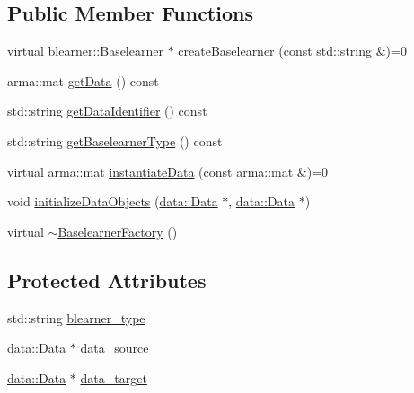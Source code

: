 \subsection*{Public Member Functions}
\begin{DoxyCompactItemize}
\item 
virtual \mbox{\hyperlink{classblearner_1_1_baselearner}{blearner\+::\+Baselearner}} $\ast$ \mbox{\hyperlink{classblearnerfactory_1_1_baselearner_factory_ac3584a20a84834099a15908690b837bb}{create\+Baselearner}} (const std\+::string \&)=0
\item 
arma\+::mat \mbox{\hyperlink{classblearnerfactory_1_1_baselearner_factory_ad9da09739f04e5c8bd268551251801be}{get\+Data}} () const
\item 
std\+::string \mbox{\hyperlink{classblearnerfactory_1_1_baselearner_factory_a40703963bb3fd273b835a99263d9b599}{get\+Data\+Identifier}} () const
\item 
std\+::string \mbox{\hyperlink{classblearnerfactory_1_1_baselearner_factory_a05d5c00f7a434548868c4ad21d0f5fda}{get\+Baselearner\+Type}} () const
\item 
virtual arma\+::mat \mbox{\hyperlink{classblearnerfactory_1_1_baselearner_factory_ac4a38c4815fb33b8d4785745117c5e57}{instantiate\+Data}} (const arma\+::mat \&)=0
\item 
void \mbox{\hyperlink{classblearnerfactory_1_1_baselearner_factory_a147d4ef123ec382fe402d562a91df4d2}{initialize\+Data\+Objects}} (\mbox{\hyperlink{classdata_1_1_data}{data\+::\+Data}} $\ast$, \mbox{\hyperlink{classdata_1_1_data}{data\+::\+Data}} $\ast$)
\item 
virtual \mbox{\hyperlink{classblearnerfactory_1_1_baselearner_factory_adc9d1d3c8fc774c9d856117632c8aadb}{$\sim$\+Baselearner\+Factory}} ()
\end{DoxyCompactItemize}
\subsection*{Protected Attributes}
\begin{DoxyCompactItemize}
\item 
std\+::string \mbox{\hyperlink{classblearnerfactory_1_1_baselearner_factory_a3382b7d9833484f63755a26447a5d2e4}{blearner\+\_\+type}}
\item 
\mbox{\hyperlink{classdata_1_1_data}{data\+::\+Data}} $\ast$ \mbox{\hyperlink{classblearnerfactory_1_1_baselearner_factory_a6194191695958b4035d3ea0841c2320c}{data\+\_\+source}}
\item 
\mbox{\hyperlink{classdata_1_1_data}{data\+::\+Data}} $\ast$ \mbox{\hyperlink{classblearnerfactory_1_1_baselearner_factory_af2cb5c226c90469c6a70b677214ecc2f}{data\+\_\+target}}
\end{DoxyCompactItemize}


